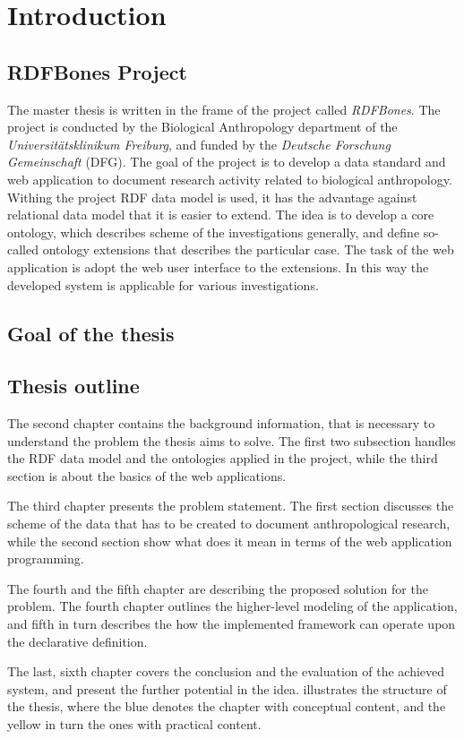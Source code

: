 \chapter{Introduction}


\section{RDFBones Project}

The master thesis is written in the frame of the project called \textit{RDFBones}. The project is conducted by the Biological Anthropology department of the \textit{Universitätsklinikum Freiburg}, and funded by the \textit{Deutsche Forschung Gemeinschaft} (DFG). 
The goal of the project is to develop a data standard and web application to document research activity related to biological anthropology. Withing the project RDF data model is used, it has the advantage against relational data model that it is easier to extend. The idea is to develop a core ontology, which describes scheme of the investigations generally, and define so-called ontology extensions that describes the particular case. The task of the web application is adopt the web user interface to the extensions. In this way the developed system is applicable for various investigations. \cite{infrastructure}

\section{Goal of the thesis}



\section{Thesis outline}

The second chapter contains the background information, that is necessary to understand the problem the thesis aims to solve. The first two subsection handles the RDF data model and the ontologies applied in the project, while the third section is about the basics of the web applications.

The third chapter presents the problem statement. The first section discusses the scheme of the data that has to be created to document anthropological research, while the second section show what does it mean in terms of the web application programming. 

The fourth and the fifth chapter are describing the proposed solution for the problem. The fourth chapter outlines the higher-level modeling of the application, and fifth in turn describes the how the implemented framework can operate upon the declarative definition.

The last, sixth chapter covers the conclusion and the evaluation of the achieved system, and present the further potential in the idea.  illustrates the structure of the thesis, where the blue denotes the chapter with conceptual content, and the yellow in turn the ones with practical content.
